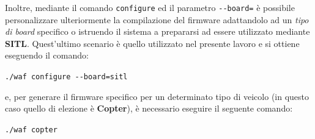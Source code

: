 \documentclass[a4paper, 12pt, oneside]{article}
\begin{document}
Inoltre, mediante il comando \texttt{configure} ed il parametro \texttt{-{}-board=} è possibile personalizzare ulteriormente la compilazione del firmware adattandolo ad un \textit{tipo di board} specifico o istruendo il sistema a prepararsi ad essere utilizzato mediante \textbf{SITL}. Quest'ultimo scenario è quello utilizzato nel presente lavoro e si ottiene eseguendo il comando:

\begin{center}
    \texttt{./waf configure -{}-board=sitl}
\end{center}

e, per generare il firmware specifico per un determinato tipo di veicolo (in questo caso quello di elezione è \textbf{Copter}), è necessario eseguire il seguente comando:

\begin{center}
    \texttt{./waf copter}
\end{center}

\newpage
\printbibliography[title={Riferimenti bibliografici}]
\end{document}
